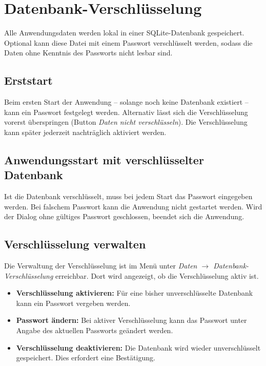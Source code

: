 \chapter{Datenbank-Verschlüsselung} \label{chap:dbEncryption}

Alle Anwendungsdaten werden lokal in einer SQLite-Datenbank gespeichert. Optional kann diese Datei mit einem Passwort verschlüsselt werden, sodass die Daten ohne Kenntnis des Passworts nicht lesbar sind.

\section{Erststart}

Beim ersten Start der Anwendung -- solange noch keine Datenbank existiert -- kann ein Passwort festgelegt werden. Alternativ lässt sich die Verschlüsselung vorerst überspringen (Button \textit{Daten nicht verschlüsseln}). Die Verschlüsselung kann später jederzeit nachträglich aktiviert werden.

\section{Anwendungsstart mit verschlüsselter Datenbank}

Ist die Datenbank verschlüsselt, muss bei jedem Start das Passwort eingegeben werden. Bei falschem Passwort kann die Anwendung nicht gestartet werden. Wird der Dialog ohne gültiges Passwort geschlossen, beendet sich die Anwendung.

\section{Verschlüsselung verwalten}

Die Verwaltung der Verschlüsselung ist im Menü unter \textit{Daten $\rightarrow$ Datenbank-Verschlüsselung} erreichbar. Dort wird angezeigt, ob die Verschlüsselung aktiv ist.

\begin{itemize}[nosep]
	\item \textbf{Verschlüsselung aktivieren:} Für eine bisher unverschlüsselte Datenbank kann ein Passwort vergeben werden.
	\item \textbf{Passwort ändern:} Bei aktiver Verschlüsselung kann das Passwort unter Angabe des aktuellen Passworts geändert werden.
	\item \textbf{Verschlüsselung deaktivieren:} Die Datenbank wird wieder unverschlüsselt gespeichert. Dies erfordert eine Bestätigung.
\end{itemize}

